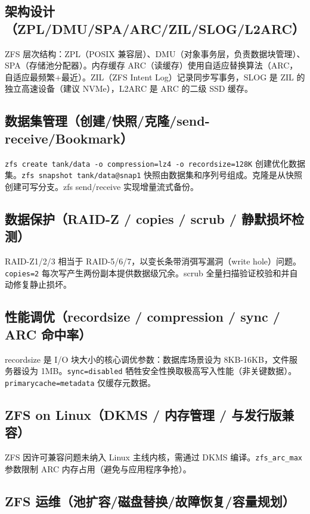\documentclass[12pt,UTF8]{ctexbook}
\begin{document}
    \subsection{架构设计（ZPL/DMU/SPA/ARC/ZIL/SLOG/L2ARC）}

ZFS 层次结构：ZPL（POSIX 兼容层）、DMU（对象事务层，负责数据块管理）、SPA（存储池分配器）。内存缓存 ARC（读缓存）使用自适应替换算法（ARC，自适应最频繁+最近）。ZIL（ZFS Intent Log）记录同步写事务，SLOG 是 ZIL 的独立高速设备（建议 NVMe），L2ARC 是 ARC 的二级 SSD 缓存。

    \subsection{数据集管理（创建/快照/克隆/send-receive/Bookmark）}

\verb|zfs create tank/data -o compression=lz4 -o recordsize=128K| 创建优化数据集。\verb|zfs snapshot tank/data@snap1| 快照由数据集和序列号组成。克隆是从快照创建可写分支。zfs send/receive 实现增量流式备份。

    \subsection{数据保护（RAID-Z / copies / scrub / 静默损坏检测）}

RAID-Z1/2/3 相当于 RAID-5/6/7，以变长条带消弭写漏洞（write hole）问题。\verb|copies=2| 每次写产生两份副本提供数据级冗余。scrub 全量扫描验证校验和并自动修复静止损坏。

    \subsection{性能调优（recordsize / compression / sync / ARC 命中率）}

recordsize 是 I/O 块大小的核心调优参数：数据库场景设为 8KB-16KB，文件服务器设为 1MB。\verb|sync=disabled| 牺牲安全性换取极高写入性能（非关键数据）。\verb|primarycache=metadata| 仅缓存元数据。

    \subsection{ZFS on Linux（DKMS / 内存管理 / 与发行版兼容）}

ZFS 因许可兼容问题未纳入 Linux 主线内核，需通过 DKMS 编译。\verb|zfs_arc_max| 参数限制 ARC 内存占用（避免与应用程序争抢）。

    \subsection{ZFS 运维（池扩容/磁盘替换/故障恢复/容量规划）}
\end{document}

